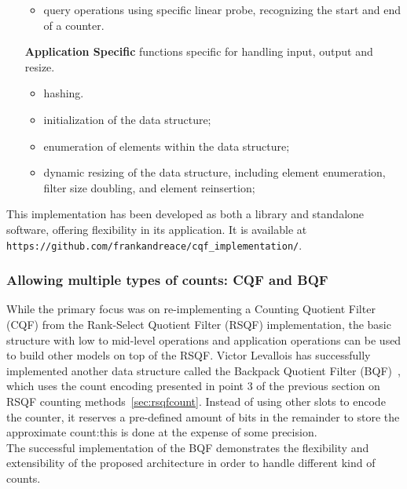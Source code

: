 \begin{itemize}[leftmargin=1.8cm]
\begin{itemize}
		\item query operations using specific linear probe, recognizing the start and end of a counter.
	\end{itemize}
	\item[\textbf{Application Specific}] functions specific for handling input, output and resize.
	\begin{itemize}
		\item \kmer hashing.
		\item initialization of the data structure;
		\item enumeration of elements within the data structure;
		\item dynamic resizing of the data structure, including element enumeration, filter size doubling, and element reinsertion;
	\end{itemize} 
\end{itemize}
This implementation has been developed as both a library and standalone software, offering flexibility in its application. It is available at \texttt{https://github.com/frankandreace/cqf_implementation/}.
\subsubsection{Allowing multiple types of counts: CQF and BQF}
While the primary focus was on re-implementing a Counting Quotient Filter (CQF) from the Rank-Select Quotient Filter (RSQF) implementation, the basic structure with low to mid-level operations and application operations can be used to build other models on top of the RSQF. Victor Levallois has successfully implemented another data structure called the Backpack Quotient Filter (BQF)~\cite{bqf}, which uses the count encoding presented in point 3 of the previous section on RSQF counting methods~\ref{sec:rsqfcount}. Instead of using other slots to encode the counter, it reserves a pre-defined amount of bits in the remainder to store the approximate count:this is done at the expense of some precision.\\
The successful implementation of the BQF demonstrates the flexibility and extensibility of the proposed architecture in order to handle different kind of counts.

